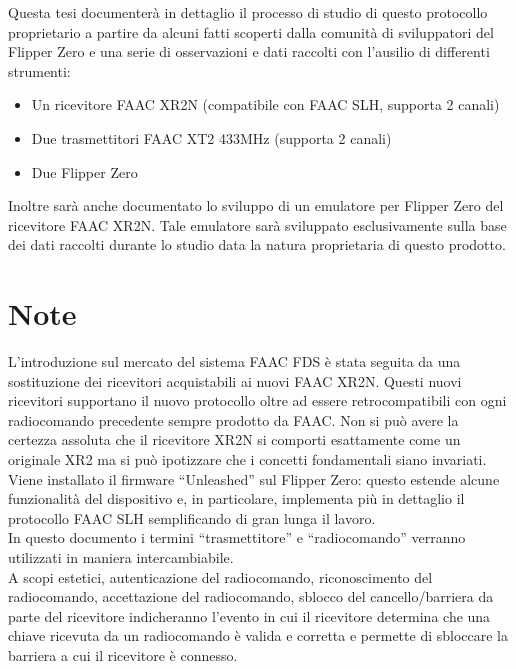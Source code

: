 Questa tesi documenterà in dettaglio il processo di studio di questo protocollo proprietario a partire da alcuni fatti scoperti dalla comunità di sviluppatori del Flipper Zero e una serie di osservazioni e dati raccolti con l’ausilio di differenti strumenti:
\begin{itemize}
  \item Un ricevitore FAAC XR2N (compatibile con FAAC SLH, supporta 2 canali)
  \item Due trasmettitori FAAC XT2 433MHz (supporta 2 canali)
  \item Due Flipper Zero
\end{itemize}
Inoltre sarà anche documentato lo sviluppo di un emulatore per Flipper Zero del ricevitore FAAC XR2N. Tale emulatore sarà sviluppato esclusivamente sulla base dei dati raccolti durante lo studio data la natura proprietaria di questo prodotto.\\

\section{Note}
\label{sec:notes}

L’introduzione sul mercato del sistema FAAC FDS è stata seguita da una sostituzione dei ricevitori acquistabili ai nuovi FAAC XR2N. Questi nuovi ricevitori supportano il nuovo protocollo oltre ad essere retrocompatibili con ogni radiocomando precedente sempre prodotto da FAAC. Non si può avere la certezza assoluta che il ricevitore XR2N si comporti esattamente come un originale XR2 ma si può ipotizzare che i concetti fondamentali siano invariati.\\
Viene installato il firmware “Unleashed” \cite{firmware} sul Flipper Zero: questo estende alcune funzionalità del dispositivo e, in particolare, implementa più in dettaglio il protocollo FAAC SLH semplificando di gran lunga il lavoro.\\
In questo documento i termini “trasmettitore” e “radiocomando” verranno utilizzati in maniera intercambiabile.\\
A scopi estetici, autenticazione del radiocomando, riconoscimento del radiocomando, accettazione del radiocomando, sblocco del cancello/barriera da parte del ricevitore indicheranno l’evento in cui il ricevitore determina che una chiave ricevuta da un radiocomando è valida e corretta e permette di sbloccare la barriera a cui il ricevitore è connesso.\\
